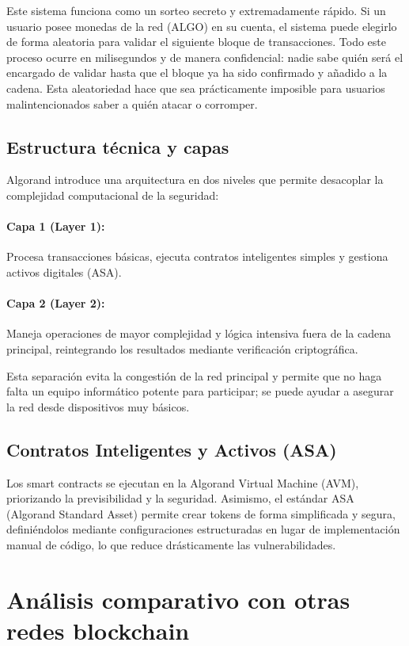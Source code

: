 \documentclass[12pt]{article}
\begin{document}
Este sistema funciona como un sorteo secreto y extremadamente rápido. Si un usuario posee monedas de la red (ALGO) en su cuenta, el sistema puede elegirlo de forma aleatoria para validar el siguiente bloque de transacciones. Todo este proceso ocurre en milisegundos y de manera confidencial: nadie sabe quién será el encargado de validar hasta que el bloque ya ha sido confirmado y añadido a la cadena. Esta aleatoriedad hace que sea prácticamente imposible para usuarios malintencionados saber a quién atacar o corromper.

\subsection{Estructura técnica y capas}

Algorand introduce una arquitectura en dos niveles que permite desacoplar la complejidad computacional de la seguridad:

\paragraph{Capa 1 (Layer 1):} Procesa transacciones básicas, ejecuta contratos inteligentes simples y gestiona activos digitales (ASA).
\paragraph{Capa 2 (Layer 2):} Maneja operaciones de mayor complejidad y lógica intensiva fuera de la cadena principal, reintegrando los resultados mediante verificación criptográfica.

Esta separación evita la congestión de la red principal y permite que no haga falta un equipo informático potente para participar; se puede ayudar a asegurar la red desde dispositivos muy básicos.

\subsection{Contratos Inteligentes y Activos (ASA)}

Los smart contracts se ejecutan en la Algorand Virtual Machine (AVM), priorizando la previsibilidad y la seguridad. Asimismo, el estándar ASA (Algorand Standard Asset) permite crear tokens de forma simplificada y segura, definiéndolos mediante configuraciones estructuradas en lugar de implementación manual de código, lo que reduce drásticamente las vulnerabilidades.

\section{Análisis comparativo con otras redes blockchain}
\end{document}
